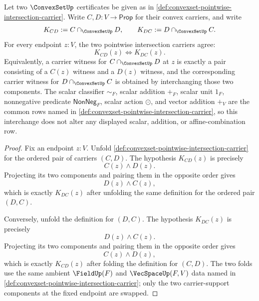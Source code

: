 \begin{theorem}
\label{thm:convexset-pointwise-intersection-carrier-commutative}
Let two $\ConvexSetUp$ certificates be given as in \autoref{def:convexset-pointwise-intersection-carrier}. Write $C,D:V\to\mathsf{Prop}$ for their convex carriers, and write
$$
K_{CD}:=C\cap_{\ConvexSetUp}D,
\qquad
K_{DC}:=D\cap_{\ConvexSetUp}C.
$$
For every endpoint $z:V$, the two pointwise intersection carriers agree:
$$
K_{CD}(z)\Longleftrightarrow K_{DC}(z).
$$
Equivalently, a carrier witness for $C\cap_{\ConvexSetUp}D$ at $z$ is exactly a pair consisting of a $C(z)$ witness and a $D(z)$ witness, and the corresponding carrier witness for $D\cap_{\ConvexSetUp}C$ is obtained by interchanging those two components. The scalar classifier $\sim_F$, scalar addition $+_F$, scalar unit $1_F$, nonnegative predicate $\mathsf{NonNeg}_F$, scalar action $\odot$, and vector addition $+_V$ are the common rows named in \autoref{def:convexset-pointwise-intersection-carrier}, so this interchange does not alter any displayed scalar, addition, or affine-combination row.
\end{theorem}
\begin{proof}
Fix an endpoint $z:V$. Unfold \autoref{def:convexset-pointwise-intersection-carrier} for the ordered pair of carriers $(C,D)$. The hypothesis $K_{CD}(z)$ is precisely
$$
C(z)\land D(z).
$$
Projecting its two components and pairing them in the opposite order gives
$$
D(z)\land C(z),
$$
which is exactly $K_{DC}(z)$ after unfolding the same definition for the ordered pair $(D,C)$.

Conversely, unfold the definition for $(D,C)$. The hypothesis $K_{DC}(z)$ is precisely
$$
D(z)\land C(z).
$$
Projecting its two components and pairing them in the opposite order gives
$$
C(z)\land D(z),
$$
which is exactly $K_{CD}(z)$ after folding the definition for $(C,D)$. The two folds use the same ambient $\FieldUp(F)$ and $\VecSpaceUp(F,V)$ data named in \autoref{def:convexset-pointwise-intersection-carrier}; only the two carrier-support components at the fixed endpoint are swapped.
\end{proof}

